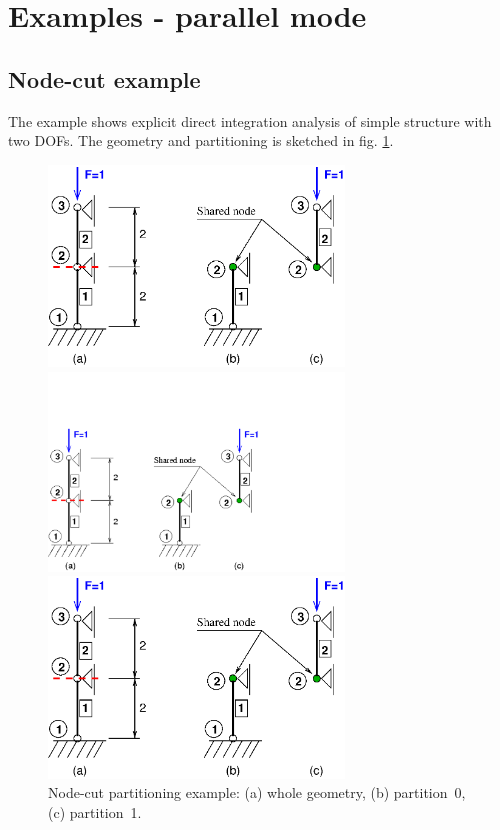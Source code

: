 \documentclass[a4paper]{article}
\begin{document}


\section{Examples - parallel mode}
\subsection{Node-cut example}
The example shows explicit direct integration analysis of
simple structure with two DOFs.
The geometry and partitioning is sketched in
fig. \ref{nodecut-ex01}.

\begin{figure}[htb]
\begin{htmlonly}
  \centerline{\includegraphics[width=0.7\textwidth]{poofem_ex01.eps}}
\end{htmlonly}
\ifpdf
\centerline{\includegraphics[width=0.7\textwidth]{poofem_ex01.pdf}}
\else
\centerline{\includegraphics[width=0.7\textwidth]{poofem_ex01.eps}}
\fi
\caption{Node-cut partitioning example: (a) whole geometry,
(b) partition~0, (c) partition~1.}
\label{nodecut-ex01}
\end{figure}
\end{document}
